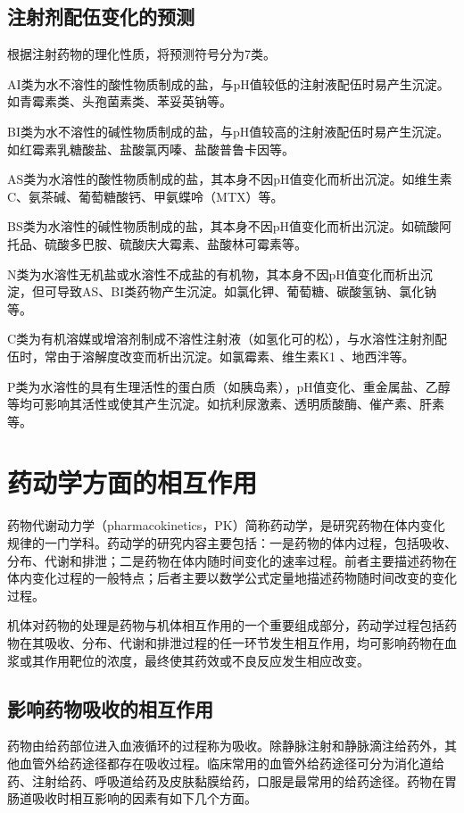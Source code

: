 \subsection{注射剂配伍变化的预测}

根据注射药物的理化性质，将预测符号分为7类。

AI类为水不溶性的酸性物质制成的盐，与pH值较低的注射液配伍时易产生沉淀。如青霉素类、头孢菌素类、苯妥英钠等。

BI类为水不溶性的碱性物质制成的盐，与pH值较高的注射液配伍时易产生沉淀。如红霉素乳糖酸盐、盐酸氯丙嗪、盐酸普鲁卡因等。

AS类为水溶性的酸性物质制成的盐，其本身不因pH值变化而析出沉淀。如维生素C、氨茶碱、葡萄糖酸钙、甲氨蝶呤（MTX）等。

BS类为水溶性的碱性物质制成的盐，其本身不因pH值变化而析出沉淀。如硫酸阿托品、硫酸多巴胺、硫酸庆大霉素、盐酸林可霉素等。

N类为水溶性无机盐或水溶性不成盐的有机物，其本身不因pH值变化而析出沉淀，但可导致AS、BI类药物产生沉淀。如氯化钾、葡萄糖、碳酸氢钠、氯化钠等。

C类为有机溶媒或增溶剂制成不溶性注射液（如氢化可的松），与水溶性注射剂配伍时，常由于溶解度改变而析出沉淀。如氯霉素、维生素K{1}
、地西泮等。

P类为水溶性的具有生理活性的蛋白质（如胰岛素），pH值变化、重金属盐、乙醇等均可影响其活性或使其产生沉淀。如抗利尿激素、透明质酸酶、催产素、肝素等。

\section{药动学方面的相互作用}

药物代谢动力学（pharmacokinetics，PK）简称药动学，是研究药物在体内变化规律的一门学科。药动学的研究内容主要包括：一是药物的体内过程，包括吸收、分布、代谢和排泄；二是药物在体内随时间变化的速率过程。前者主要描述药物在体内变化过程的一般特点；后者主要以数学公式定量地描述药物随时间改变的变化过程。

机体对药物的处理是药物与机体相互作用的一个重要组成部分，药动学过程包括药物在其吸收、分布、代谢和排泄过程的任一环节发生相互作用，均可影响药物在血浆或其作用靶位的浓度，最终使其药效或不良反应发生相应改变。

\subsection{影响药物吸收的相互作用}

药物由给药部位进入血液循环的过程称为吸收。除静脉注射和静脉滴注给药外，其他血管外给药途径都存在吸收过程。临床常用的血管外给药途径可分为消化道给药、注射给药、呼吸道给药及皮肤黏膜给药，口服是最常用的给药途径。药物在胃肠道吸收时相互影响的因素有如下几个方面。

